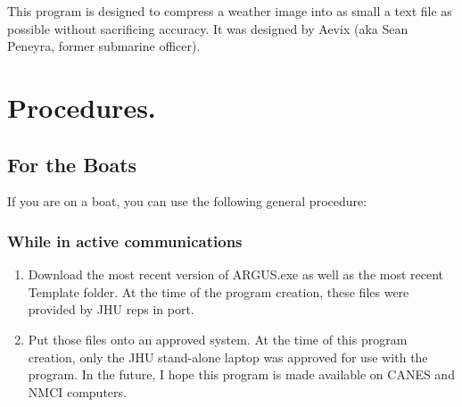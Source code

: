 This program is designed to compress a weather image into as small a text file as possible without sacrificing accuracy.  It was designed by Aevix (aka Sean Peneyra, former submarine officer).

\section{Procedures.}
\subsection{For the Boats}
If you are on a boat, you can use the following general procedure:

\subsubsection{While in active communications}
\begin{enumerate}
    \item Download the most recent version of ARGUS.exe as well as the most recent Template folder.  At the time of the program creation, these files were provided by JHU reps in port.
    \item Put those files onto an approved system.  At the time of this program creation, only the JHU stand-alone laptop was approved for use with the program.  In the future, I hope this program is made available on CANES and NMCI computers.
\end{enumerate}

